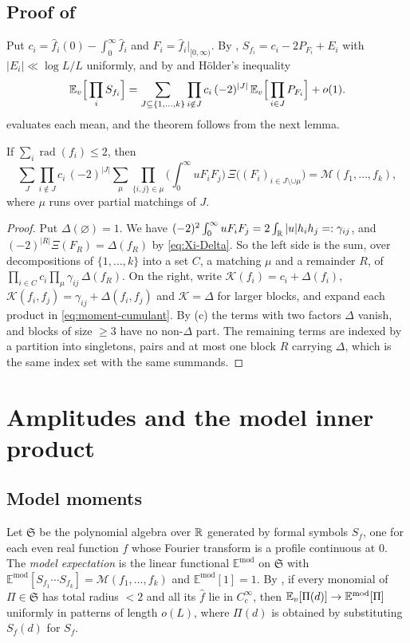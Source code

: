 \documentclass[11pt,colorlinks]{charlie}
\newcommand{\rad}{\operatorname{rad}}
\newcommand{\cM}{\mathcal{M}}
\newcommand{\Ka}{\mathcal{K}}
\begin{document}
\subsection{Proof of \texorpdfstring{}{Theorem 7}}
Put $c_i=\widehat f_i(0)-\int_0^\infty\widehat f_i$ and $F_i=\widehat f_i|_{[0,\infty)}$. By , $S_{f_i}=c_i-2P_{F_i}+E_i$ with $|E_i|\ll\log L/L$ uniformly, and by  and Hölder's inequality
\[
 \mathbb{E}_v\Big[\prod_iS_{f_i}\Big]=\sum_{J\subseteq\{1,\dots,k\}}\prod_{i\notin J}c_i\,(-2)^{|J|}\,\mathbb{E}_v\Big[\prod_{i\in J}P_{F_i}\Big]+o(1).
\]
 evaluates each mean, and the theorem follows from the next lemma.

\begin{lemma}\label{lem:reassemble}
If $\sum_i\rad(f_i)\le2$, then
\[
 \sum_{J}\prod_{i\notin J}c_i\,(-2)^{|J|}\sum_{\mu}\prod_{\{i,j\}\in\mu}\Big(\int_0^\infty uF_iF_j\Big)\,\Xi\big((F_i)_{i\in J\setminus\cup\mu}\big)=\cM(f_1,\dots,f_k),
\]
where $\mu$ runs over partial matchings of $J$.
\end{lemma}
\begin{proof}
Put $\Delta(\varnothing)=1$. We have $(-2)^2\int_0^\infty uF_iF_j=2\int_{\mathbb{R}}|u|h_ih_j=:\gamma_{ij}$, and $(-2)^{|R|}\Xi(F_R)=\Delta(f_R)$ by \eqref{eq:Xi-Delta}. So the left side is the sum, over decompositions of $\{1,\dots,k\}$ into a set $C$, a matching $\mu$ and a remainder $R$, of $\prod_{i\in C}c_i\prod_\mu\gamma_{ij}\,\Delta(f_R)$. On the right, write $\Ka(f_i)=c_i+\Delta(f_i)$, $\Ka(f_i,f_j)=\gamma_{ij}+\Delta(f_i,f_j)$ and $\Ka=\Delta$ for larger blocks, and expand each product in \eqref{eq:moment-cumulant}. By (c) the terms with two factors $\Delta$ vanish, and blocks of size $\ge3$ have no non-$\Delta$ part. The remaining terms are indexed by a partition into singletons, pairs and at most one block $R$ carrying $\Delta$, which is the same index set with the same summands.
\end{proof}

\section{Amplitudes and the model inner product}\label{sec:profiles}

\subsection{Model moments}
Let $\mathfrak S$ be the polynomial algebra over $\mathbb{R}$ generated by formal symbols $S_f$, one for each even real function $f$ whose Fourier transform is a profile continuous at $0$. The \emph{model expectation} is the linear functional $\mathbb E^{\mathrm{mod}}$ on $\mathfrak S$ with $\mathbb E^{\mathrm{mod}}[S_{f_1}\cdots S_{f_k}]=\cM(f_1,\dots,f_k)$ and $\mathbb E^{\mathrm{mod}}[1]=1$. By , if every monomial of $\Pi\in\mathfrak S$ has total radius $<2$ and all its $\widehat f$ lie in $C_c^\infty$, then $\mathbb{E}_v[\Pi(d)]\to\mathbb E^{\mathrm{mod}}[\Pi]$ uniformly in patterns of length $o(L)$, where $\Pi(d)$ is obtained by substituting $S_f(d)$ for $S_f$.
\end{document}
